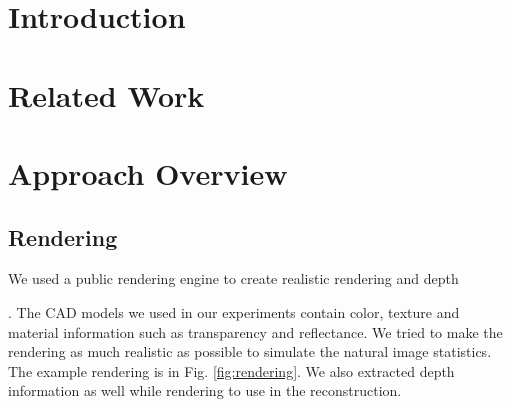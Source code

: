 \documentclass[10pt,twocolumn,letterpaper]{article}
\begin{document}
\begin{abstract}

\end{abstract}

\section{Introduction}
\label{sec:intro}

%
\section{Related Work}
\label{sec:related}



\section{Approach Overview}
\label{sec:nz-who}


\subsection{Rendering}

We used a public rendering engine to create realistic rendering and
depth . The CAD models we used
in our experiments contain color, texture and material information such as
transparency and reflectance. We tried to make the rendering as much realistic
as possible to simulate the natural image statistics. The example rendering is
in Fig. \ref{fig:rendering}. We also extracted depth information as well while
rendering to use in the reconstruction.
\end{document}
